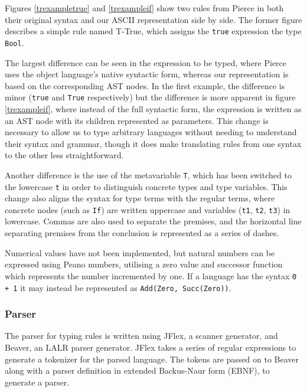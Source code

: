 \documentclass[nofilelist]{cslthse-msc}
\begin{document}
Figures \ref{trexampletrue} and \ref{trexampleif} show two rules from Pierce in both their original syntax and our ASCII representation side by side.
The former figure describes a simple rule named T-True, which assigns the \verb|true| expression the type \verb|Bool|.

The largest difference can be seen in the expression to be typed, where Pierce uses the object language's native syntactic form, whereas our representation is based on the corresponding AST nodes.
In the first example, the difference is minor (\verb|true| and \verb|True| respectively) but the difference is more apparent in figure \ref{trexampleif}, where instead of the full syntactic form, the expression is written as an AST node with its children represented as parameters.
This change is necessary to allow us to type arbitrary languages without needing to understand their syntax and grammar, though it does make translating rules from one syntax to the other less straightforward.

Another difference is the use of the metavariable \verb|T|, which has been switched to the lowercase \verb|t| in order to distinguish concrete types and type variables.
This change also aligns the syntax for type terms with the regular terms, where concrete nodes (such as \verb|If|) are written uppercase and variables (\verb|t1|, \verb|t2|, \verb|t3|) in lowercase.
Commas are also used to separate the premises, and the horizontal line separating premises from the conclusion is represented as a series of dashes.

Numerical values have not been implemented, but natural numbers can be expressed using Peano numbers\cite{peano}, utilising a zero value and successor function which represents the number incremented by one.
If a language has the syntax \verb|0 + 1| it may instead be represented as \verb|Add(Zero, Succ(Zero))|.


\subsubsection{Parser}\label{typingrulesparser}
The parser for typing rules is written using JFlex\cite{jflex}, a scanner generator, and Beaver\cite{beaver}, an LALR parser generator.
JFlex takes a series of regular expressions to generate a tokenizer for the parsed language.
The tokens are passed on to Beaver along with a parser definition in extended Backus-Naur form (EBNF), to generate a parser.
\end{document}
